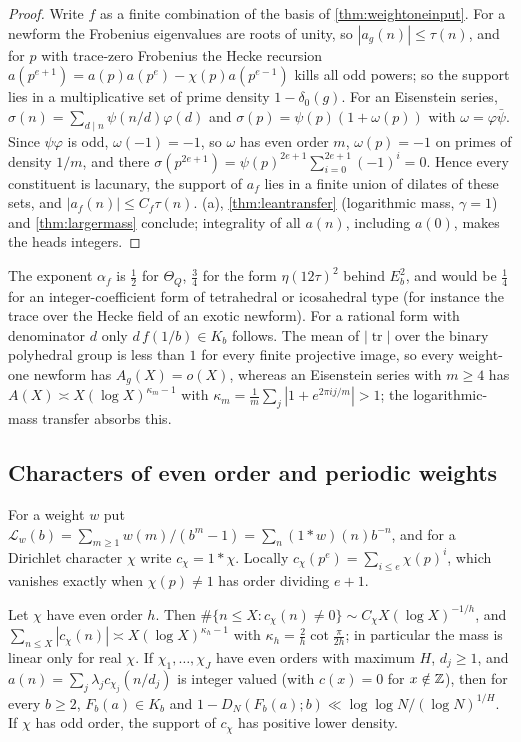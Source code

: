 \documentclass[11pt]{article}
\DeclareMathOperator{\tr}{tr}
\newcommand{\cnt}{\#}
\newcommand{\LL}{\log\log N}
\begin{document}
\begin{proof}
Write $f$ as a finite combination of the basis of \cref{thm:weightoneinput}. For a newform the
Frobenius eigenvalues are roots of unity, so $|a_g(n)|\le\tau(n)$, and for $p$ with trace-zero
Frobenius the Hecke recursion $a(p^{e+1})=a(p)a(p^e)-\chi(p)a(p^{e-1})$ kills all odd powers; so
the support lies in a multiplicative set of prime density $1-\delta_0(g)$. For an Eisenstein series,
$\sigma(n)=\sum_{d\mid n}\psi(n/d)\varphi(d)$ and $\sigma(p)=\psi(p)(1+\omega(p))$ with
$\omega=\varphi\bar\psi$. Since $\psi\varphi$ is odd, $\omega(-1)=-1$, so $\omega$ has even order $m$,
$\omega(p)=-1$ on primes of density $1/m$, and there
$\sigma(p^{2e+1})=\psi(p)^{2e+1}\sum_{i=0}^{2e+1}(-1)^i=0$. Hence every constituent is lacunary, the
support of $a_f$ lies in a finite union of dilates of these sets, and $|a_f(n)|\le C_f\tau(n)$.
(a), \cref{thm:leantransfer} (logarithmic mass, $\gamma=1$) and
\cref{thm:largermass} conclude; integrality of all $a(n)$, including $a(0)$, makes the heads integers.
\end{proof}

The exponent $\alpha_f$ is $\frac12$ for $\Theta_Q$, $\frac34$ for the form $\eta(12\tau)^2$ behind
$E_b^2$, and would be $\frac14$ for an integer-coefficient form of tetrahedral or icosahedral type
(for instance the trace over the Hecke field of an exotic newform). For a rational form with
denominator $d$ only $d\,f(1/b)\in K_b$ follows. The mean of $|\tr|$ over the binary polyhedral group
is less than $1$ for every finite projective image, so every weight-one newform has $A_g(X)=o(X)$,
whereas an Eisenstein series with $m\ge4$ has $A(X)\asymp X(\log X)^{\kappa_m-1}$ with
$\kappa_m=\frac1m\sum_j|1+e^{2\pi ij/m}|>1$; the logarithmic-mass transfer absorbs this.

\subsection{Characters of even order and periodic weights}\label{subsec:periodic}

For a weight $w$ put $\mathcal L_w(b)=\sum_{m\ge1}w(m)/(b^m-1)=\sum_n(1*w)(n)b^{-n}$, and for a
Dirichlet character $\chi$ write $c_\chi=1*\chi$. Locally $c_\chi(p^e)=\sum_{i\le e}\chi(p)^i$,
which vanishes exactly when $\chi(p)\ne1$ has order dividing $e+1$.

\begin{theorem}\label{thm:evenorder}
Let $\chi$ have even order $h$. Then $\cnt\{n\le X:c_\chi(n)\ne0\}\sim C_\chi X(\log X)^{-1/h}$, and
$\sum_{n\le X}|c_\chi(n)|\asymp X(\log X)^{\kappa_h-1}$ with $\kappa_h=\frac2h\cot\frac\pi{2h}$; in
particular the mass is linear only for real $\chi$. If $\chi_1,\dots,\chi_J$ have even orders with
maximum $H$, $d_j\ge1$, and $a(n)=\sum_j\lambda_jc_{\chi_j}(n/d_j)$ is integer valued (with
$c(x)=0$ for $x\notin\mathbb Z$), then for every $b\ge2$, $F_b(a)\in K_b$ and
$1-D_N(F_b(a);b)\ll\LL/(\log N)^{1/H}$. If $\chi$ has odd order, the support of $c_\chi$ has
positive lower density.
\end{theorem}
\end{document}
